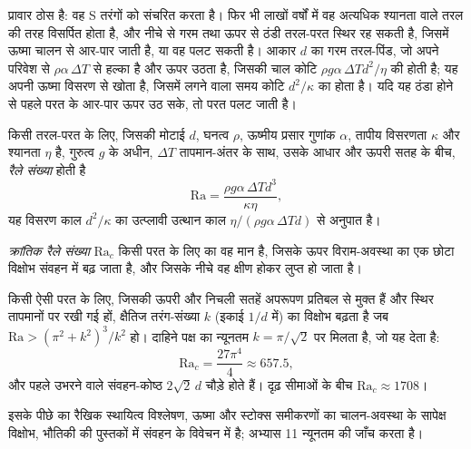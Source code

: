 प्रावार ठोस है: वह S तरंगों को संचरित करता है। फिर भी लाखों वर्षों में वह
अत्यधिक श्यानता वाले तरल की तरह विसर्पित होता है, और नीचे से गरम तथा ऊपर से ठंडी
तरल-परत स्थिर रह सकती है, जिसमें ऊष्मा चालन से आर-पार जाती है,
या वह पलट सकती है। आकार $d$ का गरम तरल-पिंड, जो अपने परिवेश से
$\rho\alpha\,\Delta T$ से हल्का है और ऊपर उठता है, जिसकी चाल कोटि
$\rho g\alpha\,\Delta T d^2/\eta$ की होती है; यह अपनी ऊष्मा विसरण से खोता है, जिसमें लगने वाला समय
कोटि $d^2/\kappa$ का होता है। यदि यह ठंडा होने से पहले परत के आर-पार ऊपर उठ सके,
तो परत पलट जाती है।

\begin{definition}[रैले संख्या]\label{def:b3:mantle-convection:rayleigh}
किसी तरल-परत के लिए, जिसकी मोटाई $d$, घनत्व $\rho$, ऊष्मीय प्रसार
गुणांक $\alpha$, तापीय विसरणता $\kappa$ और श्यानता $\eta$ है, गुरुत्व $g$ के अधीन,
$\Delta T$ तापमान-अंतर के साथ, उसके आधार और
ऊपरी सतह के बीच, \emph{रैले संख्या} होती है
\[
  \mathrm{Ra} = \frac{\rho g\alpha\,\Delta T d^3}{\kappa\eta},
\]
यह विसरण काल $d^2/\kappa$ का
उत्प्लावी उत्थान काल $\eta/(\rho g\alpha\,\Delta Td)$ से अनुपात है।
\end{definition}

\begin{definition}[क्रांतिक रैले संख्या]\label{def:b3:mantle-convection:critical}
\emph{क्रांतिक रैले संख्या}
$\mathrm{Ra}_c$ किसी परत के लिए  का वह मान है, जिसके ऊपर
विराम-अवस्था का एक छोटा विक्षोभ संवहन में बढ़ जाता है, और जिसके नीचे
वह क्षीण होकर लुप्त हो जाता है।
\end{definition}

\begin{proposition}[संवहन का आरंभ]\label{prop:b3:mantle-convection:onset}
किसी ऐसी परत के लिए, जिसकी ऊपरी और निचली सतहें अपरूपण प्रतिबल से मुक्त हैं और
स्थिर तापमानों पर रखी गई हों, क्षैतिज तरंग-संख्या $k$ (इकाई $1/d$ में) का विक्षोभ
बढ़ता है जब $\mathrm{Ra} > (\pi^2 + k^2)^3/k^2$ हो। दाहिने पक्ष का न्यूनतम
$k = \pi/\sqrt2$ पर मिलता है, जो यह देता है:
\[
  \mathrm{Ra}_c = \frac{27\pi^4}{4} \approx 657.5,
\]
और पहले उभरने वाले संवहन-कोष्ठ $2\sqrt2\,d$ चौड़े होते हैं। दृढ़ सीमाओं के बीच
$\mathrm{Ra}_c \approx 1708$।
\end{proposition}

\admitted
इसके पीछे का रैखिक स्थायित्व विश्लेषण, ऊष्मा और स्टोक्स
समीकरणों का चालन-अवस्था के सापेक्ष विक्षोभ, भौतिकी की पुस्तकों में
संवहन के विवेचन में है; अभ्यास 11 न्यूनतम की जाँच करता है।

